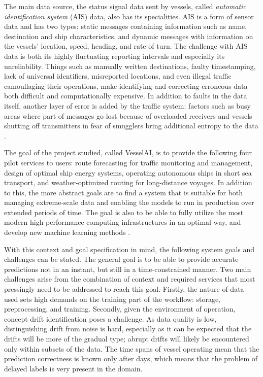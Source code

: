 The main data source, the status signal data sent by vessels, called \textit{automatic identification system} (AIS) data, also has its specialities. AIS is a form of sensor data and has two types: static messages containing information such as name, destination and ship characteristics, and dynamic messages with information on the vessels' location, speed, heading, and rate of turn. The challenge with AIS data is both its highly fluctuating reporting intervals and especially its unreliability.  Things such as manually written destinations, faulty timestamping, lack of universal identifiers, misreported locations, and even illegal traffic camouflaging their operations, make identifying and correcting erroneous data both difficult and computationally expensive. In addition to faults in the data itself, another layer of error is added by the traffic system: factors such as busy areas where part of messages go lost because of overloaded receivers and vessels shutting off transmitters in fear of smugglers bring additional entropy to the data \cite{maritimeinformatics}.

The goal of the project studied, called VesselAI, is to provide the following four pilot services to users: route forecasting for traffic monitoring and management, design of optimal ship energy systems, operating autonomous ships in short sea transport, and weather-optimized routing for long-distance voyages. In addition to this, the more abstract goals are to find a system that is suitable for both managing extreme-scale data and enabling the models to run in production over extended periods of time. The goal is also to be able to fully utilize the most modern high performance computing infrastructures in an optimal way, and develop new machine learning methods \cite{D1.1}.

With this context and goal specification in mind, the following system goals and challenges can be stated. The general goal is to be able to provide accurate predictions not in an instant, but still in a time-constrained manner. Two main challenges arise from the combination of context and required services that most pressingly need to be addressed to reach this goal. Firstly, the nature of data used sets high demands on the training part of the workflow: storage, preprocessing, and training. Secondly, given the environment of operation, concept drift identification poses a challenge. As data quality is low, distinguishing drift from noise is hard, especially as it can be expected that the drifts will be more of the gradual type; abrupt drifts will likely be encountered only within subsets of the data. The time spans of vessel operating mean that the prediction correctness is known only after days, which means that the problem of delayed labels is very present in the domain.

